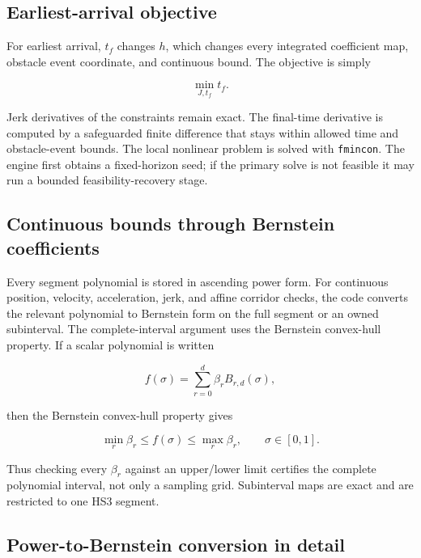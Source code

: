 \documentclass[10pt,letterpaper]{article}
\newcommand{\file}[1]{\nolinkurl{#1}}
\begin{document}
\subsection{Earliest-arrival objective}

For earliest arrival, $t_f$ changes $h$, which changes every integrated
coefficient map, obstacle event coordinate, and continuous bound. The objective
is simply

\begin{equation}
\min_{J,t_f} t_f.
\end{equation}

Jerk derivatives of the constraints remain exact. The final-time derivative is
computed by a safeguarded finite difference that stays within allowed time and
obstacle-event bounds. The local nonlinear problem is solved with
\file{fmincon}\cite{mathworksFmincon}. The engine first obtains a fixed-horizon
seed; if the primary solve is not feasible it may run a bounded
feasibility-recovery stage.

\subsection{Continuous bounds through Bernstein coefficients}

Every segment polynomial is stored in ascending power form. For continuous
position, velocity, acceleration, jerk, and affine corridor checks, the code
converts the relevant polynomial to Bernstein form on the full segment or an
owned subinterval. The complete-interval argument uses the Bernstein
convex-hull property\cite{farouki2012}. If a scalar polynomial is written

\begin{equation}
f(\sigma)=\sum_{r=0}^{d}\beta_r B_{r,d}(\sigma),
\end{equation}

then the Bernstein convex-hull property gives

\begin{equation}
\min_r\beta_r \le f(\sigma)\le \max_r\beta_r,
\qquad \sigma\in[0,1].
\end{equation}

Thus checking every $\beta_r$ against an upper/lower limit certifies the
complete polynomial interval, not only a sampling grid. Subinterval maps are
exact and are restricted to one HS3 segment.

\subsection{Power-to-Bernstein conversion in detail}
\end{document}
